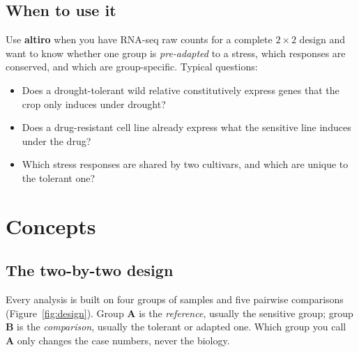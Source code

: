 \documentclass[11pt,a4paper]{article}
\newcommand{\pkg}{\textsf{\bfseries altiro}}
\newcommand{\A}{\textcolor{grpA}{\textbf{A}}}
\newcommand{\B}{\textcolor{grpB}{\textbf{B}}}
\begin{document}
\subsection{When to use it}
Use \pkg{} when you have RNA-seq raw counts for a complete \(2\times2\) design and want to know
whether one group is \emph{pre-adapted} to a stress, which responses are conserved, and which are
group-specific. Typical questions:
\begin{itemize}
  \item Does a drought-tolerant wild relative constitutively express genes that the crop only induces under drought?
  \item Does a drug-resistant cell line already express what the sensitive line induces under the drug?
  \item Which stress responses are shared by two cultivars, and which are unique to the tolerant one?
\end{itemize}

\section{Concepts}

\subsection{The two-by-two design}

Every analysis is built on four groups of samples and five pairwise comparisons
(Figure~\ref{fig:design}). Group \A{} is the \emph{reference}, usually the sensitive group; group
\B{} is the \emph{comparison}, usually the tolerant or adapted one. Which group you call \A{} only
changes the case numbers, never the biology.
\end{document}
